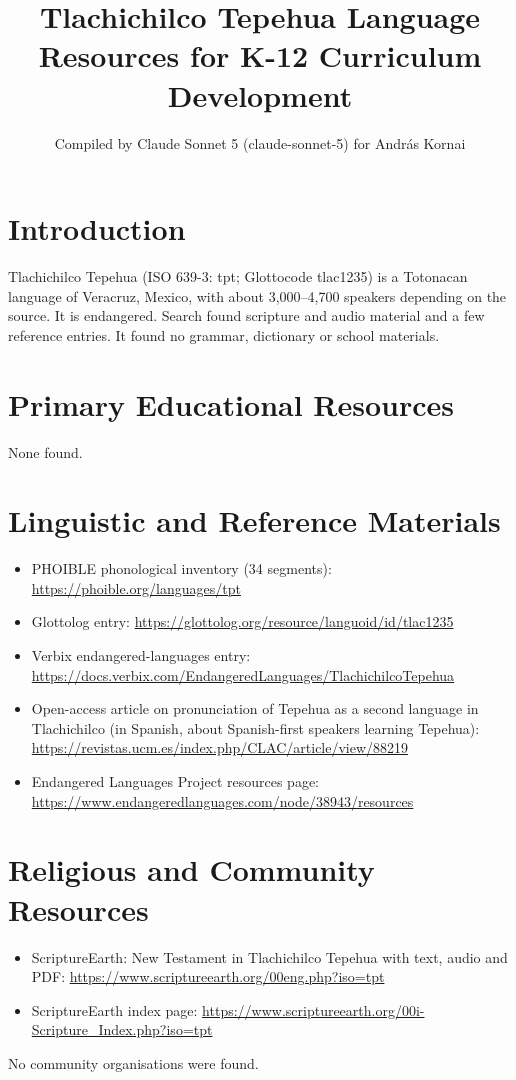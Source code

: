 \documentclass[12pt]{article}
\title{Tlachichilco Tepehua Language Resources for K-12 Curriculum Development}
\author{Compiled by Claude Sonnet 5 (claude-sonnet-5) for Andr\'as Kornai}
\date{}
\begin{document}
\maketitle

\section{Introduction}
Tlachichilco Tepehua (ISO 639-3: tpt; Glottocode tlac1235) is a Totonacan language of Veracruz, Mexico, with about 3,000--4,700 speakers depending on the source. It is endangered. Search found scripture and audio material and a few reference entries. It found no grammar, dictionary or school materials.

\section{Primary Educational Resources}
None found.

\section{Linguistic and Reference Materials}
\begin{itemize}
\item PHOIBLE phonological inventory (34 segments): \url{https://phoible.org/languages/tpt}
\item Glottolog entry: \url{https://glottolog.org/resource/languoid/id/tlac1235}
\item Verbix endangered-languages entry: \url{https://docs.verbix.com/EndangeredLanguages/TlachichilcoTepehua}
\item Open-access article on pronunciation of Tepehua as a second language in Tlachichilco (in Spanish, about Spanish-first speakers learning Tepehua): \url{https://revistas.ucm.es/index.php/CLAC/article/view/88219}
\item Endangered Languages Project resources page: \url{https://www.endangeredlanguages.com/node/38943/resources}
\end{itemize}

\section{Religious and Community Resources}
\begin{itemize}
\item ScriptureEarth: New Testament in Tlachichilco Tepehua with text, audio and PDF: \url{https://www.scriptureearth.org/00eng.php?iso=tpt}
\item ScriptureEarth index page: \url{https://www.scriptureearth.org/00i-Scripture_Index.php?iso=tpt}
\end{itemize}
No community organisations were found.
\end{document}
